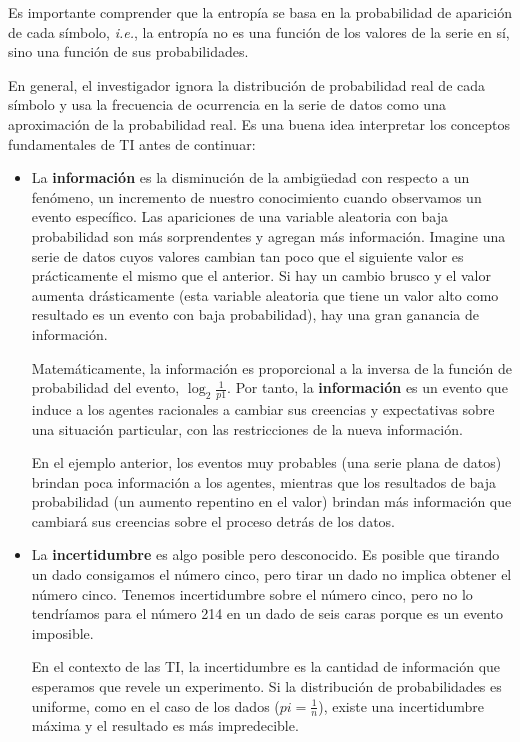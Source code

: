 \documentclass[a4paper,12pt]{article}
\begin{document}
Es importante comprender que la entropía se basa en la probabilidad de aparición de cada símbolo, \textit{i.e.}, la entropía no es una función de los valores de la serie en sí, sino una función de sus probabilidades. 

En general, el investigador ignora la distribución de probabilidad real de cada símbolo y usa la frecuencia de ocurrencia en la serie de datos como una aproximación de la probabilidad real. Es una buena idea interpretar los conceptos fundamentales de TI antes de continuar:

\begin{itemize}[noitemsep, topsep=2pt]
	\item La \textbf{información} es la disminución de la ambigüedad con respecto a un fenómeno, un incremento de nuestro conocimiento cuando observamos un evento específico. Las apariciones de una variable aleatoria con baja probabilidad son más sorprendentes y agregan más información. Imagine una serie de datos cuyos valores cambian tan poco que el siguiente valor es prácticamente el mismo que el anterior. Si hay un cambio brusco y el valor aumenta drásticamente (esta variable aleatoria que tiene un valor alto como resultado es un evento con baja probabilidad), hay una gran ganancia de información. 
	      	      	
	      Matemáticamente, la información es proporcional a la inversa de la función de probabilidad del evento, $\log_2 \frac{1}{p1}$. Por tanto, la \textbf{información} es un evento que induce a los agentes racionales a cambiar sus creencias y expectativas sobre una situación particular, con las restricciones de la nueva información. 
	      	      	
	      \clearpage	
	      	      	
	      En el ejemplo anterior, los eventos muy probables (una serie plana de datos) brindan poca información a los agentes, mientras que los resultados de baja probabilidad (un aumento repentino en el valor) brindan más información que cambiará sus creencias sobre el proceso detrás de los datos. 
	      	      
	\item La \textbf{incertidumbre} es algo posible pero desconocido. Es posible que tirando un dado consigamos el número cinco, pero tirar un dado no implica obtener el número cinco. Tenemos incertidumbre sobre el número cinco, pero no lo tendríamos para el número 214 en un dado de seis caras porque es un evento imposible. 
	      	      
	      En el contexto de las TI, la incertidumbre es la cantidad de información que esperamos que revele un experimento. Si la distribución de probabilidades es uniforme, como en el caso de los dados ($pi = \frac{1}{n}$), existe una incertidumbre máxima y el resultado es más impredecible. 
	      	      

\end{itemize}
\end{document}
